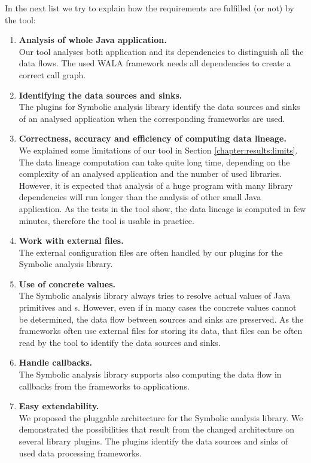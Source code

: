 In the next list we try to explain how the requirements are fulfilled (or not)
by the \ToolName tool:
\begin{enumerate}
  \item \textbf{Analysis of whole Java application.} \\
    Our tool analyses both application and its dependencies
    to distinguish all the data flows. The used WALA framework
    needs all dependencies to create a correct call graph.
  \item \textbf{Identifying the data sources and sinks.} \\
    The plugins for Symbolic analysis library identify the data sources and sinks
    of an analysed application when the corresponding frameworks are used.
  \item \textbf{Correctness, accuracy and efficiency of computing data lineage.} \\
    We explained some limitations of our \ToolName tool in Section \ref{chapter:results:limits}.
    The data lineage computation can take quite long time, depending on the complexity of an analysed
    application and the number of used libraries.
    However, it is expected that analysis of a huge program with many library dependencies
    will run longer than the analysis of other small Java application.
    As the tests in the \ToolName tool show, the data lineage is computed
    in few minutes, therefore the tool is usable in practice.
  \item \textbf{Work with external files.} \\
    The external configuration files are often handled by our plugins for the Symbolic analysis library.
  \item \textbf{Use of concrete values.} \\
    The Symbolic analysis library always tries to resolve actual values of Java primitives and
    s. However, even if in many cases the concrete values cannot be determined,
    the data flow between sources and sinks are preserved.
    As the frameworks often use external files for storing its data, that files can be often read
    by the \ToolName tool to identify the data sources and sinks.
  \item \textbf{Handle callbacks.} \\
    The Symbolic analysis library supports also computing the data flow in callbacks
    from the frameworks to applications.
  \item \textbf{Easy extendability.} \\
    We proposed the pluggable architecture for the Symbolic analysis library.
    We demonstrated the possibilities that result from the changed architecture
    on several library plugins. The plugins identify the data sources and sinks
    of used data processing frameworks.
\end{enumerate}

